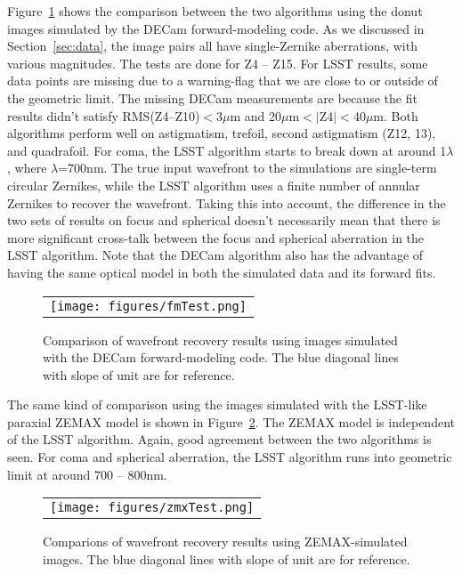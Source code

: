 \documentclass[]{spie}  %
\begin{document}
Figure~\ref{fig:fmTest} shows the comparison between the two algorithms using the donut images simulated by the DECam forward-modeling code.
As we discussed in Section~\ref{sec:data}, the image pairs all have single-Zernike aberrations, with various magnitudes. The tests are done for Z4 -- Z15.
For LSST results, some data points are missing due to a warning-flag that we are close to or outside of the geometric limit.
The missing DECam measurements are because the fit results didn't satisfy RMS(Z4--Z10)$<$3$\mu$m and 
20$\mu$m$<|$Z4$|<$40$\mu$m.
Both algorithms perform well on astigmatism, trefoil, second astigmatism (Z12, 13), and quadrafoil.
For coma, the LSST algorithm starts to break down at around 1$\lambda$, where $\lambda$=700nm.
The true input wavefront to the simulations are single-term circular Zernikes,
while the LSST algorithm uses a finite number of annular Zernikes to recover the wavefront.
Taking this into account, the difference in the two sets of results on focus and spherical
doesn't necessarily mean that there is more significant cross-talk between the focus and spherical aberration in the LSST algorithm. 
Note that the DECam algorithm also has the advantage of having the same optical model in both the simulated data and its forward fits.

   \begin{figure} [tbph]
   \begin{center}
   \begin{tabular}{c} %
   \texttt{[image: figures/fmTest.png]}
   \end{tabular}
   \end{center}
   \caption[example] 
   { \label{fig:fmTest} 
Comparison of wavefront recovery results using images simulated with the DECam forward-modeling code.
The blue diagonal lines with slope of unit are for reference.
}
   \end{figure} 
		  
The same kind of comparison using the images simulated with the LSST-like paraxial ZEMAX model is shown in Figure~\ref{fig:zmxTest}. The ZEMAX model is independent of the LSST algorithm.
Again, good agreement between the two algorithms is seen.
For coma and spherical aberration, the LSST algorithm runs into geometric limit at around %
700 -- 800nm.

   \begin{figure} [tbph]
   \begin{center}
   \begin{tabular}{c} %
   \texttt{[image: figures/zmxTest.png]}
   \end{tabular}
   \end{center}
   \caption[example] 
   { \label{fig:zmxTest} 
Comparions of wavefront recovery results using ZEMAX-simulated images.
The blue diagonal lines with slope of unit are for reference.
}
   \end{figure} 
\end{document}

